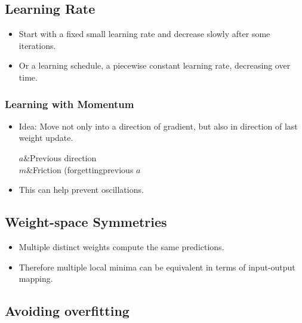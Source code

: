 \documentclass[8pt,a4paper]{scrartcl}
\begin{document}
\begin{multicols*}{3}
\subsection{Learning Rate}


\begin{itemize}
\ncompaq
\item Start with a fixed small learning rate and decrease slowly after some iterations.
\item Or a learning schedule, a piecewise constant learning rate, decreasing over time.
\end{itemize}

\subsubsection{Learning with Momentum}

\begin{itemize}
\ncompaq
\item Idea: Move not only into a direction of gradient, but also in direction of last weight update.

\begin{TDefinitionTable*}
$a$&Previous direction\\
$m$&Friction (\glqq forgetting\grqq previous $a$
\end{TDefinitionTable*}
\item This can help prevent oscillations.
\end{itemize}

\subsection{Weight-space Symmetries}

\begin{itemize}
\ncompaq
\item Multiple distinct weights compute the same predictions.
\item Therefore multiple local minima can be equivalent in terms of input-output mapping.
\end{itemize}

\subsection{Avoiding overfitting}


\end{multicols*}
\end{document}
